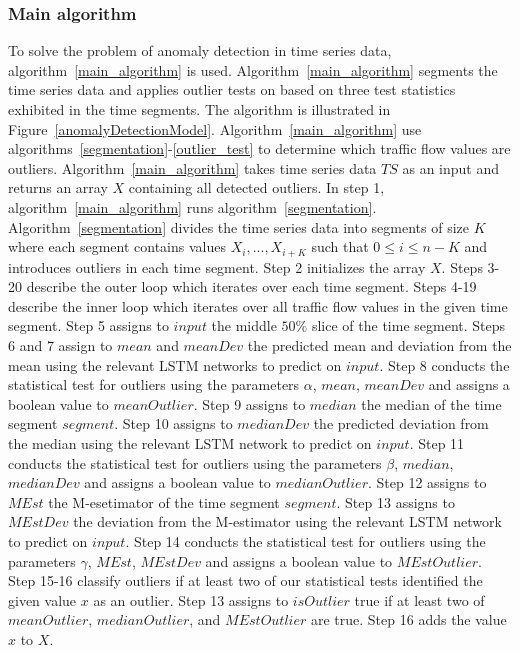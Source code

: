 \documentclass[conference]{IEEEtran}
\begin{document}
\subsubsection{Main algorithm}To solve the problem of anomaly detection in time series data, algorithm~\ref{main_algorithm} is used. Algorithm~\ref{main_algorithm} segments the time series data and applies outlier tests on based on three test statistics exhibited in the time segments. The algorithm is illustrated in  Figure~\ref{anomalyDetectionModel}. Algorithm~\ref{main_algorithm} use algorithms~\ref{segmentation}-\ref{outlier_test} to determine which traffic flow values are outliers.
Algorithm~\ref{main_algorithm} takes time series data $TS$ as an input and returns an array $X$ containing all detected outliers.
In step 1, algorithm~\ref{main_algorithm} runs  algorithm~\ref{segmentation}. Algorithm~\ref{segmentation} divides the time series data into segments of size $K$ where each segment contains values $X_i, ... , X_{i + K}$ such that $0 \leq i \leq n - K$ and introduces outliers in each time segment. Step 2 initializes the array $X$. Steps 3-20 describe the outer loop which iterates over each time segment. Steps 4-19 describe the inner loop which iterates over all traffic flow values in the given time segment. Step 5 assigns to $input$ the middle $50\%$ slice of the time segment. Steps 6 and 7 assign to $mean$ and $meanDev$ the predicted mean and deviation from the mean using the relevant LSTM networks to predict on $input$. Step 8 conducts the statistical test for outliers using the parameters $\alpha$, $mean$, $meanDev$ and assigns a boolean value to $meanOutlier$. Step 9 assigns to $median$ the median of the time segment $segment$. Step 10 assigns to $medianDev$ the predicted deviation from the median using the relevant LSTM network to predict on $input$. Step 11 conducts the statistical test for outliers using the parameters $\beta$, $median$, $medianDev$ and assigns a boolean value to $medianOutlier$. Step 12 assigns to $MEst$ the M-esetimator of the time segment $segment$. Step 13 assigns to $MEstDev$ the deviation from the M-estimator using the relevant LSTM network to predict on $input$. Step 14 conducts the statistical test for outliers using the parameters $\gamma$, $MEst$, $MEstDev$ and assigns a boolean value to $MEstOutlier$. Step 15-16 classify outliers if at least two of our statistical tests identified the given value $x$ as an outlier. Step 13 assigns to $isOutlier$ true if at least two of $meanOutlier$, $medianOutlier$, and $MEstOutlier$ are true. Step 16 adds the value $x$ to $X$.
\end{document}

